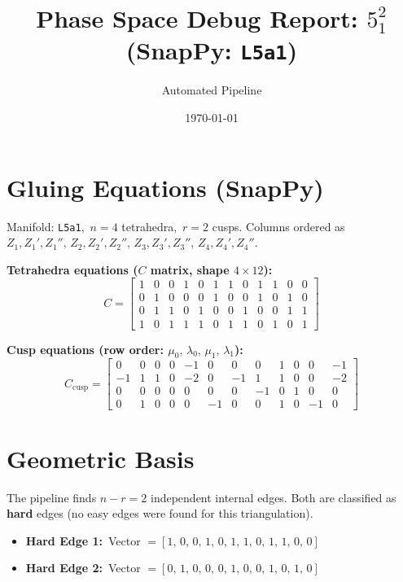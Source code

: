 \documentclass[12pt]{article}
\begin{document}
\title{Phase Space Debug Report: \texttt{$5^2_1$} (SnapPy: \texttt{L5a1})}
\author{Automated Pipeline}
\date{\today}
\maketitle

\section{Gluing Equations (SnapPy)}
Manifold: \texttt{L5a1},\ $n = 4$ tetrahedra,\ $r = 2$ cusps.
Columns ordered as $Z_1, Z_1', Z_1'',\, Z_2, Z_2', Z_2'',\, Z_3, Z_3', Z_3'',\, Z_4, Z_4', Z_4''$.

\textbf{Tetrahedra equations ($C$ matrix, shape $4 \times 12$):}
\[ C = \begin{bmatrix}
1 & 0 & 0 & 1 & 0 & 1 & 1 & 0 & 1 & 1 & 0 & 0 \\
0 & 1 & 0 & 0 & 0 & 1 & 0 & 0 & 1 & 0 & 1 & 0 \\
0 & 1 & 1 & 0 & 1 & 0 & 0 & 1 & 0 & 0 & 1 & 1 \\
1 & 0 & 1 & 1 & 1 & 0 & 1 & 1 & 0 & 1 & 0 & 1
\end{bmatrix} \]

\textbf{Cusp equations (row order: $\mu_0,\, \lambda_0,\, \mu_1,\, \lambda_1$):}
\[ C_{\mathrm{cusp}} = \begin{bmatrix}
 0 &  0 &  0 &  0 & -1 &  0 &  0 &  0 &  1 &  0 &  0 & -1 \\
-1 &  1 &  1 &  0 & -2 &  0 & -1 &  1 &  1 &  0 &  0 & -2 \\
 0 &  0 &  0 &  0 &  0 &  0 &  0 & -1 &  0 &  1 &  0 &  0 \\
 0 &  1 &  0 &  0 &  0 & -1 &  0 &  0 &  1 &  0 & -1 &  0
\end{bmatrix} \]

\section{Geometric Basis}
The pipeline finds $n - r = 2$ independent internal edges.
Both are classified as \textbf{hard} edges (no easy edges were found for this triangulation).

\begin{itemize}
    \item \textbf{Hard Edge 1:}\ Vector $= [1,\, 0,\, 0,\, 1,\, 0,\, 1,\, 1,\, 0,\, 1,\, 1,\, 0,\, 0]$
    \item \textbf{Hard Edge 2:}\ Vector $= [0,\, 1,\, 0,\, 0,\, 0,\, 1,\, 0,\, 0,\, 1,\, 0,\, 1,\, 0]$
\end{itemize}
\end{document}
